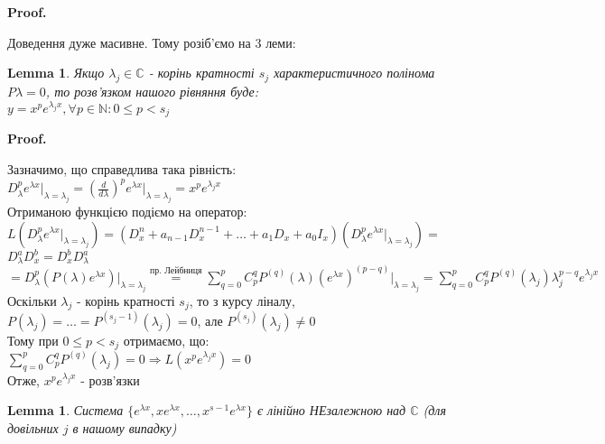 \documentclass[a4paper, 10pt]{article}
\makeatletter
\def\qed{$\blacksquare$}
\theoremstyle{theoremdd}
\theoremstyle{theoremdd}
\theoremstyle{theoremdd}
\theoremstyle{theoremdd}
\theoremstyle{theoremdd}
\theoremstyle{theoremdd}
\theoremstyle{theoremdd}
\newtheorem{lemma}[theorem]{Lemma}
\theoremstyle{theoremdd}
\renewenvironment{proof}[1][Proof.\\]{\par
\pushQED{\hfill \qed}%
\normalfont \topsep6\p@\@plus6\p@\relax
\trivlist
\item\relax
{\bfseries
#1\@addpunct{.}}\hspace\labelsep\ignorespaces
}{%
\popQED\endtrivlist\@endpefalse
}
\makeatother
\begin{document}
\begin{proof}
Доведення дуже масивне. Тому розіб'ємо на 3 леми:

\begin{lemma}
 Якщо $\lambda_j \in \mathbb{C}$ - корінь кратності $s_j$ характеристичного полінома $P{\lambda} = 0$, то розв'язком нашого рівняння буде:\\
$\displaystyle y = x^p e^{\lambda_j x}, \forall p \in \mathbb{N}: 0 \leq p < s_j$
\end{lemma}

\begin{proof}
Зазначимо, що справедлива така рівність:\\
$\displaystyle  D^p_{\lambda} {e^{\lambda x}} \Big|_{\lambda = \lambda_j} = \left(\frac{d}{d \lambda}\right)^p {e^{\lambda x}} \Big|_{\lambda = \lambda_j} = x^p e^{\lambda_j x}$\\
Отриманою функцією подіємо на оператор:\\
$L\left(D^p_{\lambda} {e^{\lambda x}} \Big|_{\lambda = \lambda_j} \right) = \left(D^n_x + a_{n-1}D^{n-1}_x+\dots+a_1D_x +a_0I_x \right) \left(D^p_{\lambda} {e^{\lambda x}} \Big|_{\lambda = \lambda_j} \right) = $\\
$D^a_\lambda D^b_x = D^b_x D^a_\lambda$\\
$\displaystyle = D^p_{\lambda} \left(P(\lambda) e^{\lambda x} \right) \Big|_{\lambda = \lambda_j} \overset{\textrm{пр. Лейбниця}}{=} \sum_{q=0}^p C_p^q P^{(q)}(\lambda) (e^{\lambda x})^{(p-q)} \Big|_{\lambda = \lambda_j} = \sum_{q=0}^p C_p^q P^{(q)}(\lambda_j) \lambda_j^{p-q} e^{\lambda_j x}$\\
Оскільки $\lambda_j$ - корінь кратності $s_j$, то з курсу ліналу,\\
$P(\lambda_j) = \dots = P^{(s_j - 1)}(\lambda_j) = 0$, але $P^{(s_j)}(\lambda_j) \neq 0$\\
Тому при $0 \leq p < s_j$ отримаємо, що:\\
$\displaystyle \sum_{q=0}^p C_p^q P^{(q)}(\lambda_j) = 0 \Rightarrow L(x^p e^{\lambda_j x}) = 0$\\
Отже, $x^p e^{\lambda_j x}$ - розв'язки 
\end{proof}

\begin{lemma}
 Система $\{e^{\lambda x}, x e^{\lambda x}, \dots, x^{s-1} e^{\lambda x}\}$ є лінійно НЕзалежною над $\mathbb{C}$ (для довільних $j$ в нашому випадку)
 \end{lemma}


\end{proof}
\end{document}

